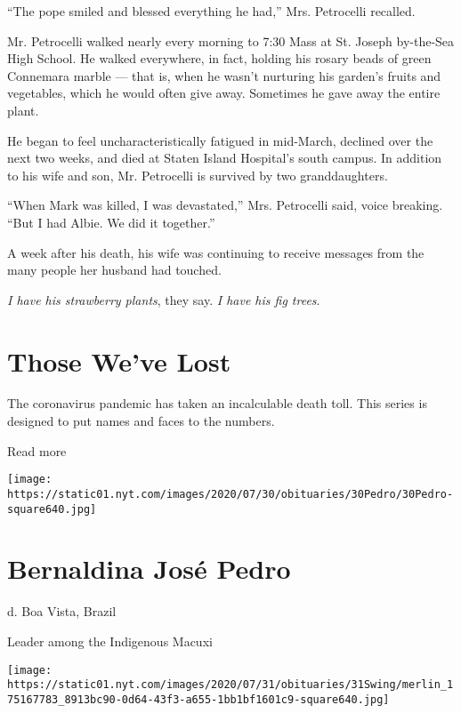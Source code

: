 ``The pope smiled and blessed everything he had,'' Mrs. Petrocelli
recalled.

Mr. Petrocelli walked nearly every morning to 7:30 Mass at St. Joseph
by-the-Sea High School. He walked everywhere, in fact, holding his
rosary beads of green Connemara marble --- that is, when he wasn't
nurturing his garden's fruits and vegetables, which he would often give
away. Sometimes he gave away the entire plant.

He began to feel uncharacteristically fatigued in mid-March, declined
over the next two weeks, and died at Staten Island Hospital's south
campus. In addition to his wife and son, Mr. Petrocelli is survived by
two granddaughters.

``When Mark was killed, I was devastated,'' Mrs. Petrocelli said, voice
breaking. ``But I had Albie. We did it together.''

A week after his death, his wife was continuing to receive messages from
the many people her husband had touched.

\emph{I have his strawberry plants}, they say. \emph{I have his fig
trees}.

\href{https://www.nytimes.com/interactive/2020/obituaries/people-died-coronavirus-obituaries.html?action=click\&pgtype=Article\&state=default\&region=BELOW_MAIN_CONTENT\&context=covid_obits_promo}{}

\hypertarget{those-weve-lost}{%
\section{Those We've Lost}\label{those-weve-lost}}

The coronavirus pandemic has taken an incalculable death toll. This
series is designed to put names and faces to the numbers.

Read more

\texttt{[image: https://static01.nyt.com/images/2020/07/30/obituaries/30Pedro/30Pedro-square640.jpg]}

\hypertarget{bernaldina-josuxe9-pedro}{%
\section{Bernaldina José Pedro}\label{bernaldina-josuxe9-pedro}}

d. Boa Vista, Brazil

Leader among the Indigenous Macuxi

\texttt{[image: https://static01.nyt.com/images/2020/07/31/obituaries/31Swing/merlin\_175167783\_8913bc90-0d64-43f3-a655-1bb1bf1601c9-square640.jpg]}

